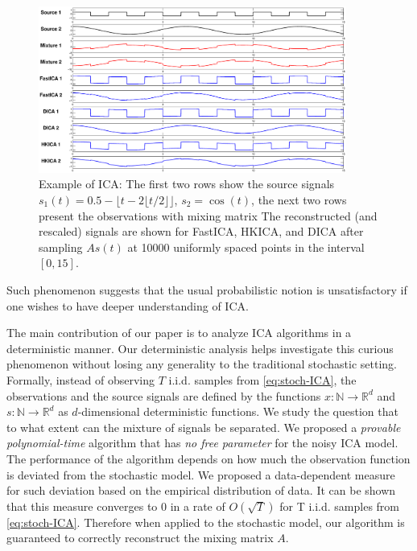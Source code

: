 \documentclass{article} %
\newcommand{\iid}{i.i.d.\xspace}
\newcommand{\ra}{\rightarrow}
\newcommand{\real}{\mathbb{R}}
\renewcommand{\natural}{\mathbb{N}}
\theoremstyle{definition}
\begin{document}
\begin{figure}[t]
\label{fig:demo}
\centering
	\includegraphics[width = 0.9\textwidth]{demo}
	\vspace{-8mm}
\caption{Example of ICA: The first two rows show the source signals $s_1(t)=0.5 - \lfloor t-2\lfloor t/2 \rfloor \rfloor$, $s_2=\cos(t)$, the next two rows present the observations with mixing matrix 
The reconstructed (and rescaled) signals are shown for FastICA, HKICA, and DICA after sampling $As(t)$ at 10000 uniformly spaced points in the interval $[0,15]$.}
\end{figure}
Such phenomenon suggests that the usual probabilistic notion is unsatisfactory if one wishes to have deeper understanding of ICA.  

The main contribution of our paper is to analyze ICA algorithms in a deterministic manner. 
Our deterministic analysis helps investigate this curious phenomenon without losing any generality to the traditional stochastic setting. 
Formally, instead of observing $T$ \iid samples from \eqref{eq:stoch-ICA}, the observations and the source signals are defined by the functions  $x:\natural \ra \real^d$ and $s:\natural \ra \real^d$ as $d$-dimensional deterministic functions. 
We study the question that to what extent can the mixture of signals be separated. 
We proposed a \emph{provable polynomial-time} algorithm that has \emph{no free parameter} for the noisy ICA model.
The performance of the algorithm depends on how much the observation function is deviated from the stochastic model. 
We proposed a data-dependent measure for such deviation based on the empirical distribution of data.
It can be shown that this measure converges to 0 in a rate of $O(\sqrt{T})$ for T \iid samples from  \eqref{eq:stoch-ICA}.
Therefore when applied to the stochastic model, our algorithm is guaranteed to correctly reconstruct the mixing matrix $A$.
\end{document}
